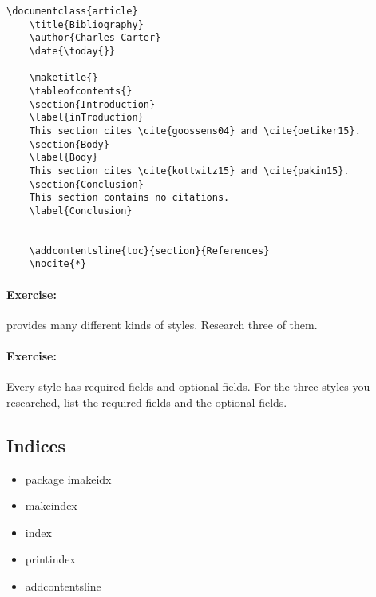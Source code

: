         \begin{verbatim}
\documentclass{article}
    \title{Bibliography}
    \author{Charles Carter}
    \date{\today{}}
 
    \maketitle{}
    \tableofcontents{}
    \section{Introduction}
    \label{inTroduction}
    This section cites \cite{goossens04} and \cite{oetiker15}.
    \section{Body}
    \label{Body}
    This section cites \cite{kottwitz15} and \cite{pakin15}.
    \section{Conclusion}
    This section contains no citations.
    \label{Conclusion}
        
    
    \addcontentsline{toc}{section}{References}
    \nocite{*}

        \end{verbatim}

        \paragraph{Exercise:} \bib provides many different kinds of styles. Research three of them.

        \paragraph{Exercise:} Every style has required fields and optional fields. For the three styles you researched, list the required fields and the optional fields.

    \subsection{Indices}
    \label{Indices}
        
        \begin{framed}
            \begin{itemize}
                \item{package imakeidx}
                \item{makeindex}
                \item{index}
                \item{printindex}
                \item{addcontentsline}
            \end{itemize}
        \end{framed}

